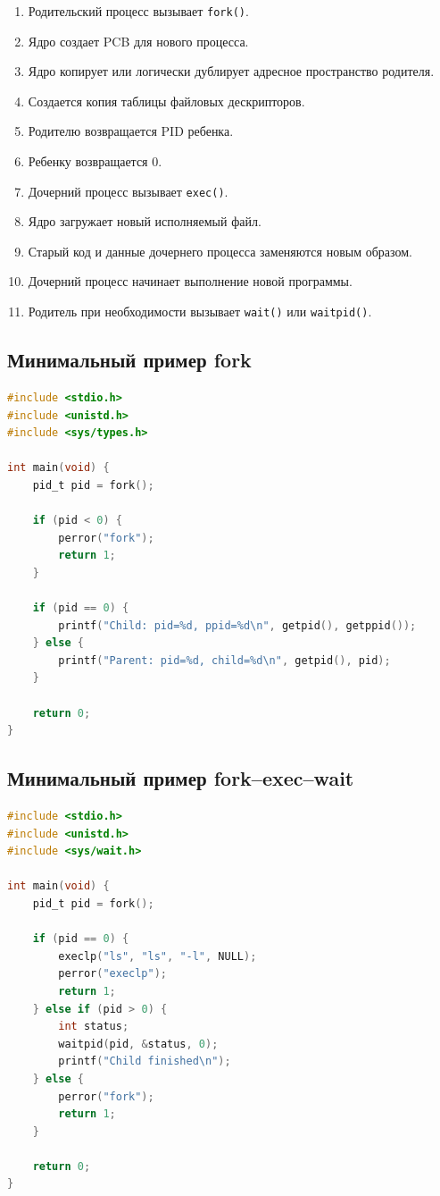 \documentclass[12pt,a4paper]{article}
\begin{document}
\begin{enumerate}
    \item Родительский процесс вызывает \texttt{fork()}.
    \item Ядро создает PCB для нового процесса.
    \item Ядро копирует или логически дублирует адресное пространство родителя.
    \item Создается копия таблицы файловых дескрипторов.
    \item Родителю возвращается PID ребенка.
    \item Ребенку возвращается $0$.
    \item Дочерний процесс вызывает \texttt{exec()}.
    \item Ядро загружает новый исполняемый файл.
    \item Старый код и данные дочернего процесса заменяются новым образом.
    \item Дочерний процесс начинает выполнение новой программы.
    \item Родитель при необходимости вызывает \texttt{wait()} или \texttt{waitpid()}.
\end{enumerate}

\subsection{Минимальный пример fork}

\begin{lstlisting}[language=C]
#include <stdio.h>
#include <unistd.h>
#include <sys/types.h>

int main(void) {
    pid_t pid = fork();

    if (pid < 0) {
        perror("fork");
        return 1;
    }

    if (pid == 0) {
        printf("Child: pid=%d, ppid=%d\n", getpid(), getppid());
    } else {
        printf("Parent: pid=%d, child=%d\n", getpid(), pid);
    }

    return 0;
}
\end{lstlisting}

\subsection{Минимальный пример fork--exec--wait}

\begin{lstlisting}[language=C]
#include <stdio.h>
#include <unistd.h>
#include <sys/wait.h>

int main(void) {
    pid_t pid = fork();

    if (pid == 0) {
        execlp("ls", "ls", "-l", NULL);
        perror("execlp");
        return 1;
    } else if (pid > 0) {
        int status;
        waitpid(pid, &status, 0);
        printf("Child finished\n");
    } else {
        perror("fork");
        return 1;
    }

    return 0;
}
\end{lstlisting}
\end{document}
